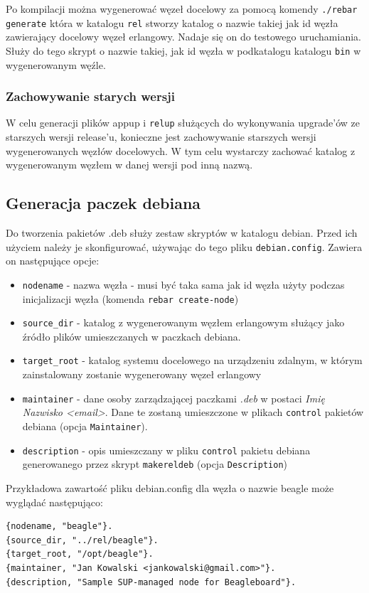 \documentclass[polish,12pt]{aghthesis}
\begin{document}
Po kompilacji można wygenerować węzeł docelowy za pomocą komendy \texttt{./rebar generate} która w katalogu \texttt{rel} stworzy katalog o nazwie takiej jak id węzła zawierający docelowy węzeł erlangowy. Nadaje się on do testowego uruchamiania. Służy do tego skrypt o nazwie takiej, jak id węzła w podkatalogu katalogu \texttt{bin} w wygenerowanym węźle.

\subsubsection{Zachowywanie starych wersji}

W celu generacji plików appup i \texttt{relup} służących do wykonywania upgrade'ów ze starszych wersji release'u, konieczne jest zachowywanie starszych wersji wygenerowanych węzłów docelowych. W tym celu wystarczy zachować katalog z wygenerowanym węzłem w danej wersji pod inną nazwą.

\subsection{Generacja paczek debiana}
Do tworzenia pakietów .deb służy zestaw skryptów w katalogu debian. Przed ich użyciem należy je skonfigurować, używając do tego pliku \texttt{debian.config}. Zawiera on następujące opcje:
\begin{itemize}
\item \texttt{nodename} - nazwa węzła - musi być taka sama jak id węzła użyty podczas inicjalizacji węzła (komenda \texttt{rebar create-node})
\item \texttt{source\_dir} - katalog z wygenerowanym węzłem erlangowym służący jako źródło plików umieszczanych w paczkach debiana.
\item \texttt{target\_root} - katalog systemu docelowego na urządzeniu zdalnym, w którym zainstalowany zostanie wygenerowany węzeł erlangowy
\item \texttt{maintainer} - dane osoby zarządzającej paczkami \emph{.deb} w postaci \emph{Imię Nazwisko <email>}. Dane te zostaną umieszczone w plikach \texttt{control} pakietów debiana (opcja \texttt{Maintainer}).
\item \texttt{description} - opis umieszczany w pliku \texttt{control} pakietu debiana generowanego przez skrypt \texttt{makereldeb} (opcja \texttt{Description})
\end{itemize}
Przykładowa zawartość pliku debian.config dla węzła o nazwie beagle może wyglądać następująco:
\begin{verbatim}
{nodename, "beagle"}.
{source_dir, "../rel/beagle"}.
{target_root, "/opt/beagle"}.
{maintainer, "Jan Kowalski <jankowalski@gmail.com>"}.
{description, "Sample SUP-managed node for Beagleboard"}.
\end{verbatim}
\end{document}
